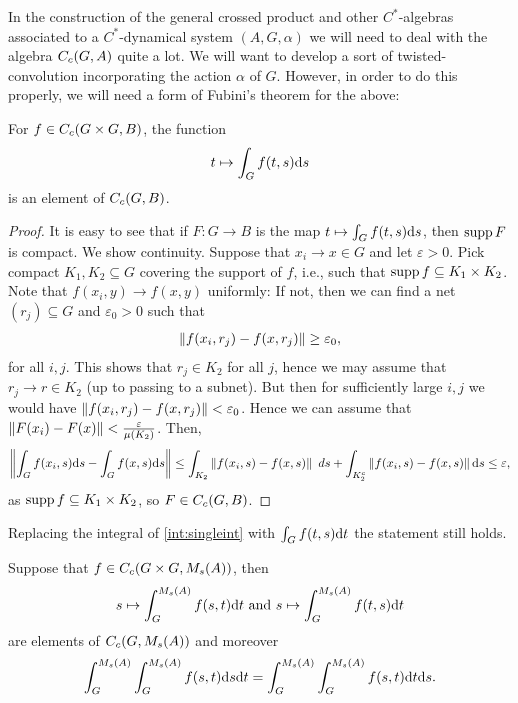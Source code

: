 In the construction of the general crossed product and other $C^*$-algebras associated to a $C^*$-dynamical system $(A,G,\alpha)$ we will need to deal with the algebra $C_c(G,A)$ quite a lot. We will want to develop a sort of twisted-convolution incorporating the action $\alpha$ of $G$. However, in order to do this properly, we will need a form of Fubini's theorem for the above:
\begin{lemma}
For $f \in C_c(G \times G  , B)$, the function
\begin{align*}
	t \mapsto \int_G f(t,s) \mathrm{d} s
\end{align*}
is an element of $C_c(G,B)$.
\label{int:singleint}
\end{lemma}
\begin{proof}
It is easy to see that if $F \colon G \to B$ is the map $t \mapsto \int_G f(t,s) \mathrm{d} s$, then $ \operatorname{supp} F$ is compact. We show continuity. Suppose that $x_i \to x \in G$ and let $ \varepsilon > 0$. Pick compact $K_1,K_2 \subseteq G$ covering the support of $f$, i.e., such that $ \operatorname{supp} f \subseteq K_1 \times K_2$. Note that $f(x_i,y) \to f(x,y)$ uniformly: If not, then we can find a net $(r_j)\subseteq G$ and $\varepsilon_0 > 0$ such that
\begin{align*}
	\left\lVert f(x_i,r_j) - f(x,r_j) \right\rVert \geq \varepsilon_0,
\end{align*}
for all $i,j$. This shows that $r_j \in K_2$ for all $j$, hence we may assume that $r_j \to r \in K_2$ (up to passing to a subnet). But then for sufficiently large $i,j$ we would have $\left\lVert f(x_i,r_j) - f(x,r_j) \right\rVert < \varepsilon_0$. Hence we can assume that $\left\lVert F(x_i) - F(x) \right\rVert < \frac{\varepsilon}{ \mu(K_2)}$. Then, 
\begin{align*}
	\left\lVert \int_G f(x_i,s) \mathrm{d} s - \int_G f(x,s) \mathrm{d} s \right\rVert \leq \int_{K_2} \left\lVert f(x_i,s) - f(x,s) \right\rVert \ d s + \int_{K_2^c} \left\lVert f(x_i,s) - f(x,s) \right\rVert \mathrm{d} s  \leq \varepsilon,
\end{align*}
as $\operatorname{supp} f \subseteq K_1 \times K_2$, so $F \in C_c(G,B)$.
\end{proof}
\begin{corollary}
Replacing the integral of \cref{int:singleint} with $\int_G f(t,s) \mathrm{d} t$ the statement still holds.
\end{corollary}
\begin{theorem}
Suppose that $f \in C_c(G \times G, M_s(A))$, then 
\begin{align*}
	s \mapsto \int_G^{M_s(A)} f(s,t) \mathrm{d} t \text{ and } s \mapsto \int_G^{M_s(A)} f(t,s) \mathrm{d} t
\end{align*}
are elements of $C_c(G,M_s(A))$ and moreover
\begin{align*}
	\int_G^{M_s(A)} \int_G^{M_s(A)} f(s,t) \mathrm{d} s \mathrm{d} t = \int_G^{M_s(A)} \int_G^{M_s(A)} f(s,t) \mathrm{d} t \mathrm{d} s.
\end{align*}
\label{int:fubini}
\end{theorem}
